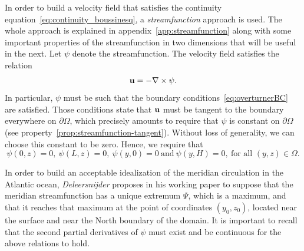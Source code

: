 In order to build a velocity field that satisfies the continuity equation~\eqref{eq:continuity_boussinesq}, a \textit{streamfunction} approach is used. The whole approach is explained in appendix~\ref{app:streamfunction} along with some important properties of the streamfunction in two dimensions that will be useful in the next. Let $\psi$ denote the streamfunction. The velocity field satisfies the relation
\begin{equation}
	\mathbf u = - \nabla \times \psi.
\end{equation}
In particular, $\psi$ must be such that the boundary conditions~\eqref{eq:overturnerBC} are satisfied. Those conditions state that $\mathbf u$ must be tangent to the boundary everywhere on $\partial \Omega$, which precisely amounts to require that $\psi$ is constant on $\partial \Omega$ (see property~\ref{prop:streamfunction-tangent}). Without loss of generality, we can choose this constant to be zero. Hence, we require that 
\begin{equation}
	\psi(0,z) = 0, \ \psi(L,z) = 0, \ \psi(y,0) = 0 \ \mbox{and} \ \psi(y,H) = 0,\ \mbox{for all $(y,z) \in \Omega$}.
\end{equation}

In order to build an acceptable idealization of the meridian circulation in the Atlantic ocean, \textit{Deleersnijder} proposes in his working paper \cite{deleersnijder2006overturner} to suppose that the meridian streamfunction has a unique extremum $\Psi$, which is a maximum, and that it reaches that maximum at the point of coordinates $(y_0,z_0)$, located near the surface and near the North boundary of the domain. It is important to recall that the second partial derivatives of $\psi$ must exist and be continuous for the above relations to hold.

